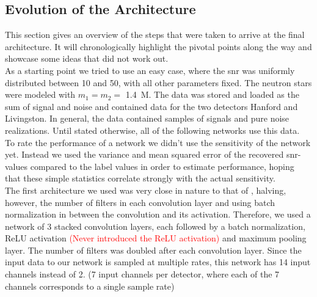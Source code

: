 \subsection{Evolution of the Architecture}\label{sec:evolution_of_architecture}
This section gives an overview of the steps that were taken to arrive at the final architecture. It will chronologically highlight the pivotal points along the way and showcase some ideas that did not work out.\\
As a starting point we tried to use an easy case, where the \gls{snr} was uniformly distributed between 10 and 50, with all other parameters fixed. The neutron stars were modeled with $m_1=m_2=$ \SI{1.4}{M_\odot}. The data was stored and loaded as the sum of signal and noise and contained data for the two detectors Hanford and Livingston. In general, the data contained samples of signals and pure noise realizations. Until stated otherwise, all of the following networks use this data.\\
To rate the performance of a network we didn't use the sensitivity of the network yet. Instead we used the variance and mean squared error of the recovered \gls{snr}-values compared to the label values in order to estimate performance, hoping that these simple statistics correlate strongly with the actual sensitivity.\medskip\\
The first architecture we used was very close in nature to that of \cite{huerta_parameter_estimation}, halving, however, the number of filters in each convolution layer and using batch normalization in between the convolution and its activation. Therefore, we used a network of 3 stacked convolution layers, each followed by a batch normalization, ReLU activation \textcolor{red}{(Never introduced the ReLU activation)} and maximum pooling layer. The number of filters was doubled after each convolution layer. Since the input data to our network is sampled at multiple rates, this network has 14 input channels instead of 2. (7 input channels per detector, where each of the 7 channels corresponds to a single sample rate)\\
